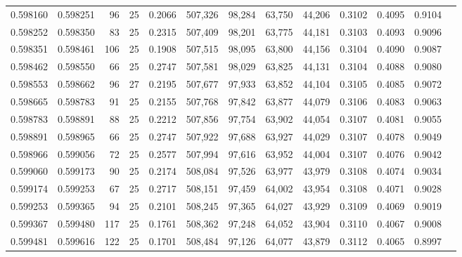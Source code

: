 \begin{tabular}{rrrrrrrrrrrrr}
0.598160 & 0.598251 &    96 &  25 &                                     0.2066 & 507,326 &  98,284 &  63,750 &  44,206 & 0.3102 & 0.4095 & 0.9104 \\
0.598252 & 0.598350 &    83 &  25 &                                     0.2315 & 507,409 &  98,201 &  63,775 &  44,181 & 0.3103 & 0.4093 & 0.9096 \\
0.598351 & 0.598461 &   106 &  25 &                                     0.1908 & 507,515 &  98,095 &  63,800 &  44,156 & 0.3104 & 0.4090 & 0.9087 \\
0.598462 & 0.598550 &    66 &  25 &                                     0.2747 & 507,581 &  98,029 &  63,825 &  44,131 & 0.3104 & 0.4088 & 0.9080 \\
0.598553 & 0.598662 &    96 &  27 &                                     0.2195 & 507,677 &  97,933 &  63,852 &  44,104 & 0.3105 & 0.4085 & 0.9072 \\
0.598665 & 0.598783 &    91 &  25 &                                     0.2155 & 507,768 &  97,842 &  63,877 &  44,079 & 0.3106 & 0.4083 & 0.9063 \\
0.598783 & 0.598891 &    88 &  25 &                                     0.2212 & 507,856 &  97,754 &  63,902 &  44,054 & 0.3107 & 0.4081 & 0.9055 \\
0.598891 & 0.598965 &    66 &  25 &                                     0.2747 & 507,922 &  97,688 &  63,927 &  44,029 & 0.3107 & 0.4078 & 0.9049 \\
0.598966 & 0.599056 &    72 &  25 &                                     0.2577 & 507,994 &  97,616 &  63,952 &  44,004 & 0.3107 & 0.4076 & 0.9042 \\
0.599060 & 0.599173 &    90 &  25 &                                     0.2174 & 508,084 &  97,526 &  63,977 &  43,979 & 0.3108 & 0.4074 & 0.9034 \\
0.599174 & 0.599253 &    67 &  25 &                                     0.2717 & 508,151 &  97,459 &  64,002 &  43,954 & 0.3108 & 0.4071 & 0.9028 \\
0.599253 & 0.599365 &    94 &  25 &                                     0.2101 & 508,245 &  97,365 &  64,027 &  43,929 & 0.3109 & 0.4069 & 0.9019 \\
0.599367 & 0.599480 &   117 &  25 &                                     0.1761 & 508,362 &  97,248 &  64,052 &  43,904 & 0.3110 & 0.4067 & 0.9008 \\
0.599481 & 0.599616 &   122 &  25 &                                     0.1701 & 508,484 &  97,126 &  64,077 &  43,879 & 0.3112 & 0.4065 & 0.8997 \\

\end{tabular}
